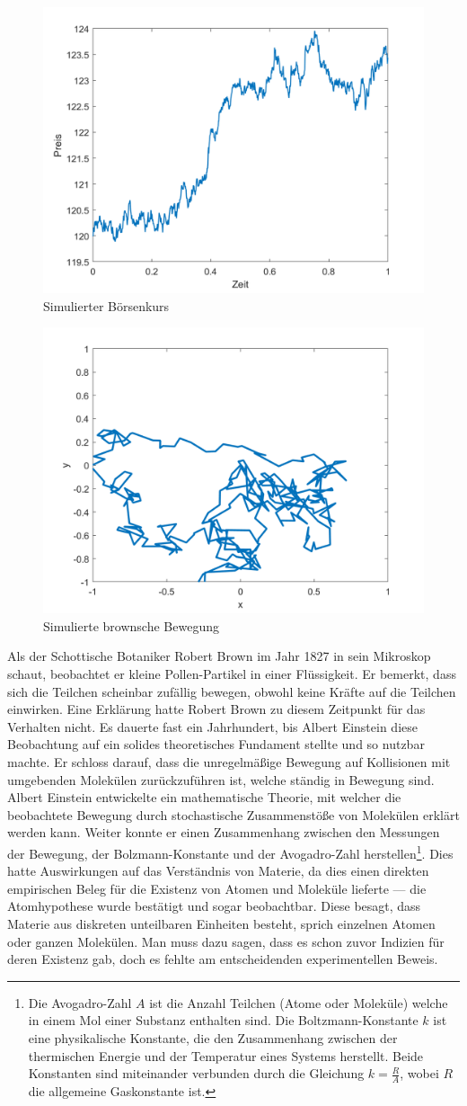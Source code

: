 \begin{figure}
	\centering
	\includegraphics[width=0.45\linewidth]{papers/brown/images/simulierter-boersenkurs.png}
	\caption{Simulierter Börsenkurs}
	\label{brown:1Dbrownian2}
\end{figure}
\begin{figure}
	\centering
	\includegraphics[width=0.45\linewidth]{papers/brown/images/simulierte-bronsche-bewegung.png}
	\caption{Simulierte brownsche Bewegung}
	\label{brown:2Dbrownian2}
\end{figure}

Als der Schottische Botaniker Robert Brown im Jahr 1827 in sein Mikroskop schaut, beobachtet er kleine Pollen-Partikel in einer Flüssigkeit. Er bemerkt, dass sich die Teilchen scheinbar zufällig bewegen, obwohl keine Kräfte auf die Teilchen einwirken. Eine Erklärung hatte Robert Brown zu diesem Zeitpunkt für das Verhalten nicht. Es dauerte fast ein Jahrhundert, bis Albert Einstein diese Beobachtung auf ein solides theoretisches Fundament stellte und so nutzbar machte. Er schloss darauf, dass die unregelmäßige Bewegung auf Kollisionen mit umgebenden Molekülen zurückzuführen ist, welche ständig in Bewegung sind. Albert Einstein entwickelte ein mathematische Theorie, mit welcher die beobachtete Bewegung durch stochastische Zusammenstöße von Molekülen erklärt werden kann. Weiter konnte er einen Zusammenhang zwischen den Messungen der Bewegung, der Bolzmann-Konstante und der  Avogadro-Zahl herstellen\footnote{Die Avogadro-Zahl $ A $ ist die Anzahl Teilchen (Atome oder Moleküle) welche in einem Mol einer Substanz enthalten sind. Die Boltzmann-Konstante $ k $ ist eine physikalische Konstante, die den Zusammenhang zwischen der thermischen Energie und der Temperatur eines Systems herstellt. Beide Konstanten sind miteinander verbunden durch die Gleichung $ k = \frac{R}{A} $, wobei $ R $ die allgemeine Gaskonstante ist.}. Dies hatte Auswirkungen auf das Verständnis von Materie, da dies einen direkten empirischen Beleg für die Existenz von Atomen und Moleküle lieferte --- die Atomhypothese wurde bestätigt und sogar beobachtbar. Diese besagt, dass Materie aus diskreten unteilbaren Einheiten besteht, sprich einzelnen Atomen oder ganzen Molekülen. Man muss dazu sagen, dass es schon zuvor Indizien für deren Existenz gab, doch es fehlte am entscheidenden experimentellen Beweis.


